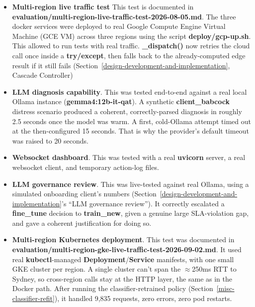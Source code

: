 \begin{itemize}
\item \textbf{Multi-region live traffic test} This test is documented in
\textbf{evaluation/multi-region-live-traffic-test-2026-08-05.md}. The three docker 
services were deployed to real Google Compute Engine Virtual Machine (GCE VM)
across three regions using the script \textbf{deploy/gcp-up.sh}. This allowed to run
tests with real traffic. \textbf{\_dispatch()} now retries the cloud call once inside a
\textbf{try/except}, then falls back to the already-computed edge result if it
still fails (Section~\ref{design-development-and-implementation}, Cascade Controller)
\item \textbf{LLM diagnosis capability}. This was tested end-to-end against a
real local Ollama instance (\textbf{gemma4:12b-it-qat}). A synthetic 
\textbf{client\_babcock} distress scenario produced a coherent, 
correctly-parsed diagnosis in roughly 2.5 seconds once the model was warm.
A first, cold-Ollama attempt timed out at the then-configured 15 seconds. 
That is why the provider's default timeout was raised to 20 seconds.
\item \textbf{Websocket dashboard}. This was tested with a real
\textbf{uvicorn} server, a real websocket client, and temporary
action-log files.
\item \textbf{LLM governance review}. This was live-tested against real
Ollama, using a simulated onboarding client's numbers (Section~\ref{design-development-and-implementation}'s 
``LLM governance review''). It correctly escalated a \textbf{fine\_tune} decision to
\textbf{train\_new}, given a genuine large SLA-violation gap, and gave
a coherent justification for doing so.
\item \textbf{Multi-region Kubernetes deployment}. This test was documented in
\textbf{evaluation/multi-region-gke-live-traffic-test-2026-09-02.md}.
It used real \textbf{kubectl}-managed \textbf{Deployment}/\textbf{Service}
manifests, with one small GKE cluster per region. A single cluster
can't span the $\approx$250ms RTT to Sydney, so cross-region calls stay
at the HTTP layer, the same as in the Docker path. After running the
classifier-retrained policy (Section~\ref{misc-classifier-refit}), it
handled 9,835 requests, zero errors, zero pod restarts.


\end{itemize}
